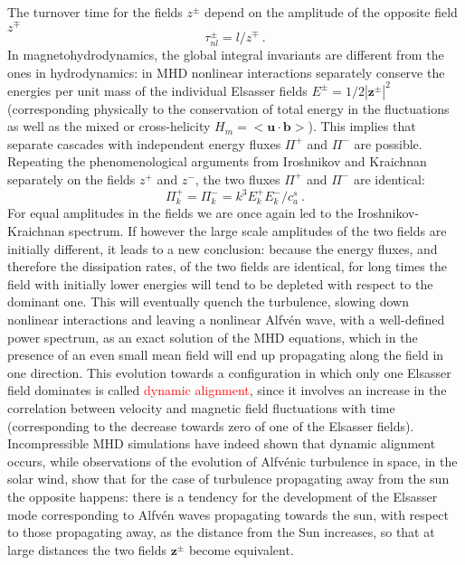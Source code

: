 \documentclass[12pt,a4paper]{article}
\renewcommand{\vec}[1]{\boldsymbol{#1}}
\begin{document}
The turnover time for the fields $z^\pm$ depend on the amplitude of the opposite field $z^\mp$
\begin{equation}
\tau^\pm_{nl} = l/z^\mp ~.
\end{equation}
In magnetohydrodynamics, the global integral invariants are different from the ones in hydrodynamics: in MHD nonlinear interactions separately conserve the energies per unit mass of the individual Elsasser fields $E^\pm = 1/2|\vec{z}^\pm|^2$ (corresponding physically to the conservation of total energy in the fluctuations as well as the mixed or cross-helicity $H_m = <\vec{u}\cdot \vec{b}>$). This implies that separate cascades with independent energy fluxes $\Pi^+$ and $\Pi^-$ are possible. Repeating the phenomenological arguments from Iroshnikov and Kraichnan separately on the fields $z^+$ and $z^-$, the two fluxes $\Pi^+$ and $\Pi^-$ are identical:
\begin{equation}
\Pi^+_k = \Pi^-_k = k^3 E^+_k E^-_k /c^s_a ~.
\end{equation}
For equal amplitudes in the fields we are once again led to the Iroshnikov-Kraichnan spectrum. If however the large scale amplitudes of the two fields are initially different, it leads to a new conclusion: because the energy fluxes, and therefore the dissipation rates, of the two fields are identical, for long times the field with initially lower energies will tend to be depleted with respect to the dominant one. This will eventually quench the turbulence, slowing down nonlinear interactions and leaving a nonlinear Alfv\'en wave, with a well-defined power spectrum, as an exact solution of the MHD equations, which in the presence of an even small mean field will end up propagating along the field in one direction. This evolution towards a configuration in which only one Elsasser field dominates is called \textcolor{red}{dynamic alignment}, since it involves an increase in the correlation between velocity and magnetic field fluctuations with time (corresponding to the decrease towards zero of one of the Elsasser fields). Incompressible MHD simulations have indeed shown that dynamic alignment occurs, while observations of the evolution of Alfv\'enic turbulence in space, in the solar wind, show that for the case of turbulence propagating away from the sun the opposite happens: there is a tendency for the development of the Elsasser mode corresponding to Alfv\'en waves propagating towards the sun, with respect to those propagating away, as the distance from the Sun increases, so that at large distances the two fields $\vec{z}^\pm$ become equivalent.
\end{document}
